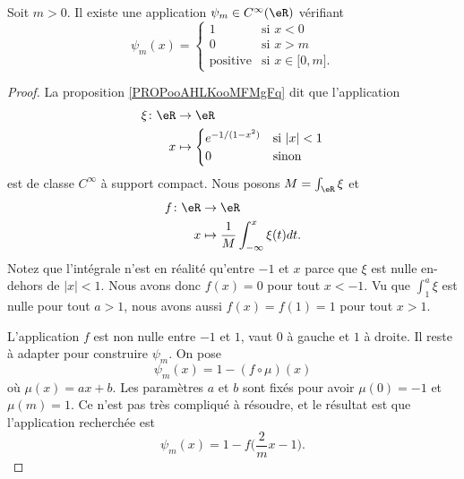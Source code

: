 \begin{lemma}       \label{LEMooRVSIooKcpWoK}
	Soit \( m>0\). Il existe une application \( \psi_m\in  C^{\infty}(\eR)\) vérifiant
	\begin{equation}
		\psi_m(x)=\begin{cases}
			1               & \text{si } x<0                               \\
			0               & \text{si } x>m                               \\
			\text{positive} & \text{si } x\in\mathopen[ 0 , m \mathclose].
		\end{cases}
	\end{equation}
\end{lemma}

\begin{proof}
	La proposition \ref{PROPooAHLKooMFMgFq} dit que l'application
	\begin{equation}
		\begin{aligned}
			\xi\colon \eR & \to \eR                                     \\
			x             & \mapsto \begin{cases}
				                        e^{-1/(1-x^2)} & \text{si } | x |<1 \\
				                        0              & \text{sinon }
			                        \end{cases}
		\end{aligned}
	\end{equation}
	est de classe \( C^{\infty}\) à support compact. Nous posons \( M=\int_{\eR}\xi\) et
	\begin{equation}
		\begin{aligned}
			f\colon \eR & \to \eR                                       \\
			x           & \mapsto \frac{1}{ M}\int_{-\infty}^x\xi(t)dt.
		\end{aligned}
	\end{equation}
	Notez que l'intégrale n'est en réalité qu'entre \( -1\) et \( x\) parce que \( \xi\) est nulle en-dehors de \( | x |<1\). Nous avons donc \( f(x)=0\) pour tout \( x<-1\). Vu que \( \int_{1}^a\xi\) est nulle pour tout \( a>1\), nous avons aussi \( f(x)=f(1)=1\) pour tout \( x>1\).

	L'application \( f\) est non nulle entre \( -1\) et \( 1\), vaut \( 0\) à gauche et \( 1\) à droite. Il reste à adapter pour construire \( \psi_m\). On pose
	\begin{equation}
		\psi_m(x)=1-(f\circ\mu)(x)
	\end{equation}
	où \( \mu(x)=ax+b\). Les paramètres \( a\) et \( b\) sont fixés pour avoir \( \mu(0)=-1\) et \( \mu(m)=1\). Ce n'est pas très compliqué à résoudre, et le résultat est que l'application recherchée est
	\begin{equation}
		\psi_m(x)=1-f\big( \frac{ 2 }{ m }x-1 \big).
	\end{equation}
\end{proof}

